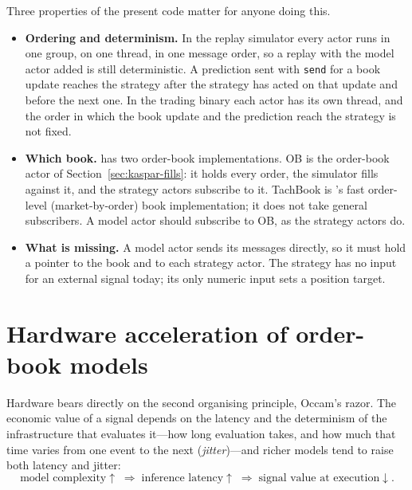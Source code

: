 Three properties of the present code matter for anyone doing this.
\begin{itemize}[leftmargin=1.5em,itemsep=1pt]
\item \textbf{Ordering and determinism.} In the replay simulator every actor runs in one group, on one thread, in
  one message order, so a replay with the model actor added is still deterministic. A prediction sent with \texttt{send} for a book update reaches the strategy after the strategy has acted
  on that update and before the next one.
  In the trading binary each actor has its own thread, and the order in which the book update and the prediction
  reach the strategy is not fixed.
\item \textbf{Which book.} \kasparhft{} has two order-book implementations. OB is the order-book actor of
  Section~\ref{sec:kaspar-fills}: it holds every order, the simulator fills against it, and the strategy actors
  subscribe to it. TachBook is \kasparhft{}'s fast order-level (market-by-order) book implementation; it does not
  take general subscribers. A model actor should subscribe to OB, as the strategy actors do.
\item \textbf{What is missing.} A model actor sends its messages directly, so it must hold a pointer to the book and
  to each strategy actor. The strategy has no input for an external signal today; its only numeric input sets a
  position target.
\end{itemize}

\section{Hardware acceleration of order-book models}
\label{sec:hardware}

Hardware bears directly on the second organising principle, Occam's razor. The economic value of a signal
depends on the latency and the determinism of the infrastructure that evaluates it---how long evaluation takes, and
how much that time varies from one event to the next (\emph{jitter})---and richer models tend to raise both latency
and jitter:
\begin{equation}
  \text{model complexity} \uparrow \;\Rightarrow\; \text{inference latency} \uparrow \;\Rightarrow\;
  \text{signal value at execution} \downarrow .
\end{equation}

